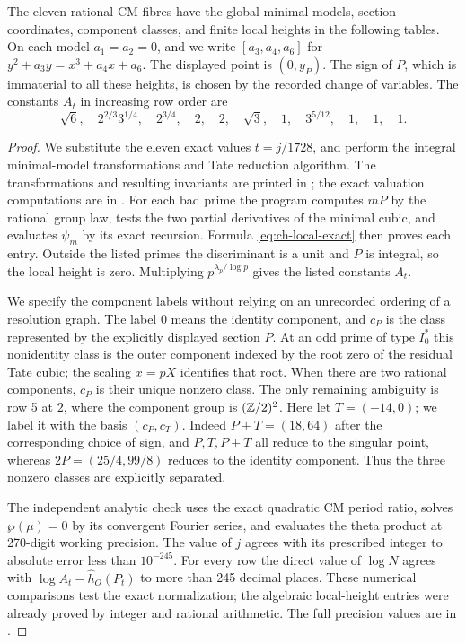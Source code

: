 \begin{statement}
The eleven rational CM fibres have the global minimal models,
section coordinates, component classes, and finite local heights
in the following tables. On each model $a_1=a_2=0$, and we
write $[a_3,a_4,a_6]$ for
$y^2+a_3y=x^3+a_4x+a_6$. The displayed point is $(0,y_P)$.
The sign of $P$, which is immaterial to all these heights,
is chosen by the recorded change of variables.
The constants $A_t$ in increasing row order are
\[
 \sqrt6,\quad 2^{2/3}3^{1/4},\quad 2^{3/4},\quad
 2,\quad 2,\quad \sqrt3,\quad 1,\quad 3^{5/12},\quad
 1,\quad1,\quad1.
\]
\end{statement}
\begin{proof}
We substitute the eleven exact values $t=j/1728$, and perform
the integral minimal-model transformations and Tate reduction
algorithm. The transformations and resulting invariants are
printed in ; the exact valuation
computations are in .
For each bad prime the program computes $mP$ by the rational
group law, tests the two partial derivatives of the minimal
cubic, and evaluates $\psi_m$ by its exact recursion. Formula
\eqref{eq:ch-local-exact} then proves each entry. Outside the
listed primes the discriminant is a unit and $P$ is integral,
so the local height is zero. Multiplying $p^{\lambda_p/\log p}$
gives the listed constants $A_t$.

We specify the component labels without relying on an
unrecorded ordering of a resolution graph. The label $0$
means the identity component, and $c_P$ is the class represented
by the explicitly displayed section $P$. At an odd prime of
type $I_0^*$ this nonidentity class is the outer component
indexed by the root zero of the residual Tate cubic; the
scaling $x=pX$ identifies that root. When there are two
rational components, $c_P$ is their unique nonzero class.
The only remaining ambiguity is row 5 at $2$, where the
component group is $(\mathbb Z/2)^2$. Here let $T=(-14,0)$;
we label it with the basis $(c_P,c_T)$. Indeed
$P+T=(18,64)$ after the corresponding choice of sign,
and $P,T,P+T$ all reduce to the singular point, whereas
$2P=(25/4,99/8)$ reduces to the identity component.
Thus the three nonzero classes are explicitly separated.

The independent analytic check uses the exact quadratic CM
period ratio, solves $\wp(\mu)=0$ by its convergent Fourier
series, and evaluates the theta product at 270-digit working
precision. The value of $j$ agrees with its prescribed integer
to absolute error less than $10^{-245}$. For every row the
direct value of $\log N$ agrees with
$\log A_t-\widehat h_O(P_t)$ to more than 245 decimal places.
These numerical comparisons test the exact normalization;
the algebraic local-height entries were already proved by
integer and rational arithmetic. The full precision values
are in .
\end{proof}

